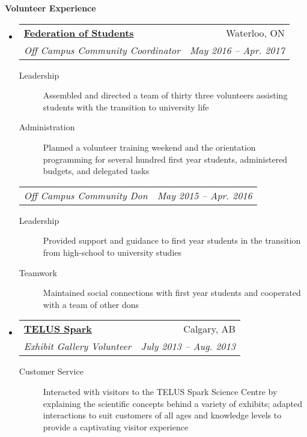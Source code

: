 \documentclass[letterpaper,11pt]{article}
\makeatletter
\newcommand{\resheading}[1]{\colorbox{resBlue}{\begin{minipage}{\textwidth}
			\textbf{#1}
\end{minipage}} \vspace{-14pt}}
\newcommand{\resitem}[4]{\begin{tabular*}{17.5cm}{l@{\extracolsep{\fill}}r} \textbf{#1} & #2 \\ \textit{#3} & \textit{#4} \\ \end{tabular*} \vspace{-6pt}}
\newcommand{\ressubitem}[2]{\begin{tabular*}{17.5cm}{l@{\extracolsep{\fill}}r} \textit{#1} & \textit{#2} \\ \end{tabular*} \vspace{-6pt}}
\makeatother
\begin{document}
\resheading{Volunteer Experience}
\begin{itemize}
\item 
	\resitem{\href{https://feds.ca/}{Federation of Students}}{Waterloo, ON}{Off Campus Community Coordinator}{May 2016 -- Apr. 2017}
		{\footnotesize \begin{description}
				\item[Leadership] Assembled and directed a team of thirty three volunteers assisting students with the transition to university life
				\item[Administration] {Planned a volunteer training weekend and the orientation programming for several hundred first year students, administered budgets, and delegated tasks}
			\end{description}}
	\ressubitem{Off Campus Community Don}{May 2015 -- Apr. 2016}
		{\footnotesize \begin{description}
				\item[Leadership] Provided support and guidance to first year students in the transition from high-school to university studies
				\item[Teamwork] Maintained social connections with first year students and cooperated with a team of other dons
			\end{description}}
		
\item
	\resitem{\href{http://www.sparkscience.ca/}{TELUS Spark}}{Calgary, AB}{Exhibit Gallery Volunteer}{July 2013 -- Aug. 2013}
		{\footnotesize \begin{description}
			\item[Customer Service] Interacted with visitors to the TELUS Spark Science Centre by explaining the scientific concepts behind a variety of exhibits; adapted interactions to suit customers of all ages and knowledge levels to provide a captivating visitor experience
		\end{description}}
\end{itemize}
\end{document}
